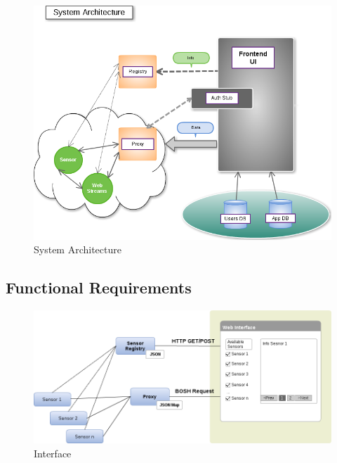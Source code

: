 \begin{figure}[!ht]
\centering
\includegraphics[scale=0.5]{images/Structure.png}   
\caption[System Architecture]{System Architecture}
\label{img:structure}                           
\end{figure}

\subsection{Functional Requirements}
\begin{figure}[!ht]
\centering
\includegraphics[scale=0.5]{images/Interface.png}   
\caption[Interface]{Interface}
\label{img:interfaces}                           
\end{figure}

